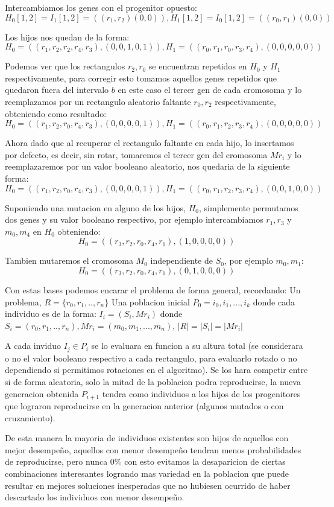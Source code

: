 \documentclass[10pt]{article}
\begin{document}
Intercambiamos los genes con el progenitor opuesto:
$$H_0[1,2] = I_1[1,2] = ((r_1,r_2)(0,0)), H_1[1,2] = I_0[1,2] = ((r_0,r_1)(0,0))$$ 

Los hijos nos quedan de la forma: 
$$H_0=((r_1,r_2,r_2,r_4,r_3),(0,0,1,0,1)), H_1 = ((r_0,r_1,r_0,r_3,r_4),(0,0,0,0,0))$$

Podemos ver que los rectangulos $r_2, r_0$ se encuentran repetidos en $H_0$ y $H_1$ respectivamente, para corregir esto tomamos aquellos genes repetidos que quedaron fuera del intervalo $b$ en este caso el tercer gen de cada cromosoma y lo reemplazamos por un rectangulo aleatorio faltante $r_0, r_2$ respectivamente, obteniendo como resultado:
$$H_0=((r_1,r_2,r_0,r_4,r_3),(0,0,0,0,1)), H_1 = ((r_0,r_1,r_2,r_3,r_4),(0,0,0,0,0))$$

Ahora dado que al recuperar el rectangulo faltante en cada hijo, lo insertamos por defecto, es decir, sin rotar, tomaremos el tercer gen del cromosoma $Mr_i$ y lo reemplazaremos por un valor booleano aleatorio, nos quedaria de la siguiente forma:
$$H_0=((r_1,r_2,r_0,r_4,r_3),(0,0,0,0,1)), H_1 = ((r_0,r_1,r_2,r_3,r_4),(0,0,1,0,0))$$

Suponiendo una mutacion en alguno de los hijos, $H_0$, simplemente permutamos dos genes y su valor booleano respectivo, por ejemplo intercambiamos $r_1,r_3$ y $m_0,m_4$ en $H_0$ obteniendo:
$$H_0=((r_3,r_2,r_0,r_4,r_1),(1,0,0,0,0))$$

Tambien mutaremos el cromosoma $M_0$ independiente de $S_0$, por ejemplo $m_0,m_1$:
$$H_0=((r_3,r_2,r_0,r_4,r_1),(0,1,0,0,0))$$

Con estas bases podemos encarar el problema de forma general, recordando: 
Un problema, $R = \{r_0,r_1,..,r_n\}$
Una poblacion inicial $P_0={i_0,i_1,...,i_k}$ donde cada individuo es de la forma:
$I_i = (S_i,Mr_i)$ donde $S_i = (r_0,r_1,..,r_n), Mr_i = (m_0, m_1,...,m_n)$, $|R| = |S_i| = |Mr_i|$

A cada inviduo $I_j \in P_i$ se lo evaluara en funcion a su altura total (se considerara o no el valor booleano respectivo a cada rectangulo, para evaluarlo rotado o no dependiendo si permitimos rotaciones en el algoritmo). Se los hara competir entre si de forma aleatoria, solo la mitad de la poblacion podra reproducirse, la nueva generacion obtenida $P_{i+1}$ tendra como individuos a los hijos de los progenitores que lograron reproducirse en la generacion anterior (algunos mutados o con cruzamiento). 

De esta manera la mayoria de individuos existentes son hijos de aquellos con mejor desempeño, aquellos con menor desempeño tendran menos probabilidades de reproducirse, pero nunca 0\% con esto evitamos la desaparicion de ciertas combinaciones interesantes logrando mas variedad en la poblacion que puede resultar en mejores soluciones inesperadas que no hubiesen ocurrido de haber descartado los individuos con menor desempeño.
\end{document}
